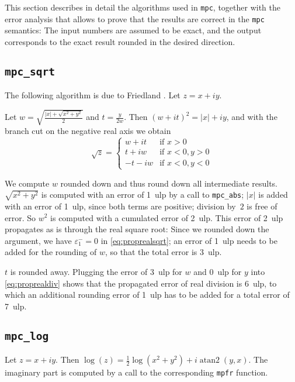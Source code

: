 \documentclass [11pt]{article}
\newcommand {\mpc}{{\tt mpc}}
\newcommand {\mpfr}{{\tt mpfr}}
\newcommand {\ulp}[1]{#1~ulp}
\newcommand {\atantwo}{\operatorname {atan2}}
\renewcommand {\epsilon}{\varepsilon}
\begin{document}
This section describes in detail the algorithms used in \mpc, together with
the error analysis that allows to prove that the results are correct in the
{\mpc} semantics: The input numbers are assumed to be exact, and the output
corresponds to the exact result rounded in the desired direction.


\subsection {\texttt {mpc\_sqrt}}

The following algorithm is due to Friedland \cite{Friedland67,Smith98}.
Let $z = x + i y$.

Let $w = \sqrt { \frac {|x| + \sqrt {x^2 + y^2}}{2}}$ and
$t = \frac {y}{2w}$. Then $(w + it)^2 = |x| + iy$, and with the branch cut on the negative real axis we obtain
\[
\sqrt z = \left\{
\begin {array}{cl}
w + i t & \text {if } x > 0 \\
t + i w & \text {if } x < 0, y > 0 \\
-t - i w & \text {if } x < 0, y < 0
\end {array}
\right.
\]

We compute $w$ rounded down and thus round down all intermediate results.
$\sqrt {x^2 + y^2}$ is computed with an error of \ulp{1}
by a call to \texttt {mpc\_abs}; $|x|$ is added with an error of \ulp{1},
since both terms are positive; division by~$2$ is free of error. So
$w^2$ is computed with a cumulated error of \ulp{2}.
This error of \ulp{2} propagates as is through the real square root:
Since we rounded down the argument, we have $\epsilon_1^- = 0$ in
\eqref {eq:proprealsqrt}; an error of \ulp{1} needs to be added for the
rounding of $w$, so that the total error is \ulp{3}.

$t$ is rounded away. Plugging the error of \ulp{3} for $w$ and \ulp{0} for $y$ into
\eqref {eq:proprealdiv} shows that the propagated error of real division is
\ulp{6}, to which an additional rounding error of \ulp{1} has to be added
for a total error of \ulp{7}.


\subsection {\texttt {mpc\_log}}

Let $z = x + i y$. Then $\log (z) = \frac {1}{2} \log (x^2 + y^2) + i \atantwo (y, x)$. The imaginary part is computed by a call to the corresponding {\mpfr} function.
\end{document}
